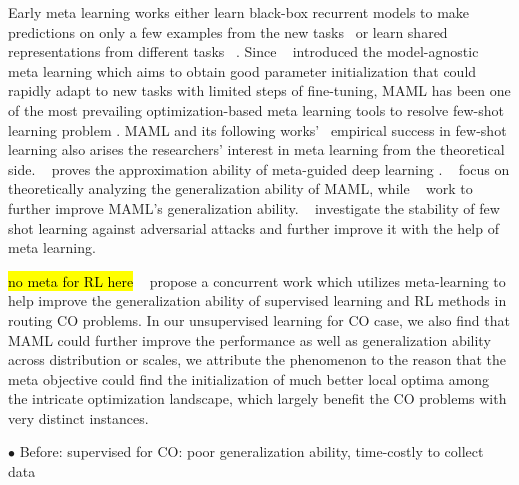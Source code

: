 \iffalse
Early meta learning works either learn black-box  recurrent  models to make predictions on only a few examples from the new tasks~\citep{andrychowicz2016learning,chen2017learning,hochreiter2001learning,schmidhuber1993neural} or learn shared representations from different tasks ~\citep{snell2017prototypical,vinyals2016matching}. Since ~\cite{finn2017model} introduced the model-agnostic meta learning which aims to obtain good parameter initialization that could rapidly adapt to new tasks with limited steps of fine-tuning, MAML has been one of the most prevailing optimization-based meta learning tools to resolve few-shot learning problem . MAML and its following works'~\citep{rajeswaran2019meta,nichol2018first,rothfuss2018promp} empirical success in few-shot learning also arises the researchers' interest in meta learning from the theoretical side. ~\cite{finn2017meta} proves the approximation ability of meta-guided deep learning . ~\cite{farid2021generalization,rothfuss2021pacoh,chen2021generalization,fallah2021generalization} focus on theoretically analyzing the generalization ability of MAML, while ~\cite{park2019meta,gonzalez2020improved,denevi2018learning} work to further improve MAML's generalization ability. ~\cite{wang2021fast,goldblum2020adversarially} investigate the stability of few shot learning against adversarial attacks and further improve it with the help of meta learning. 

\hl{no meta for RL here} 
~\cite{manchanda2022generalization} propose a concurrent work which utilizes meta-learning to help improve the generalization ability of supervised learning and RL methods in routing CO problems. 
In our unsupervised learning for CO case, we also find that MAML could further improve the performance as well as generalization ability across distribution or scales, we attribute the phenomenon to the reason that the meta objective could find the initialization of much better local optima among the intricate optimization landscape, which largely benefit the CO problems with very distinct instances.


$\bullet$ Before: supervised for CO: poor generalization ability, time-costly to collect data 

